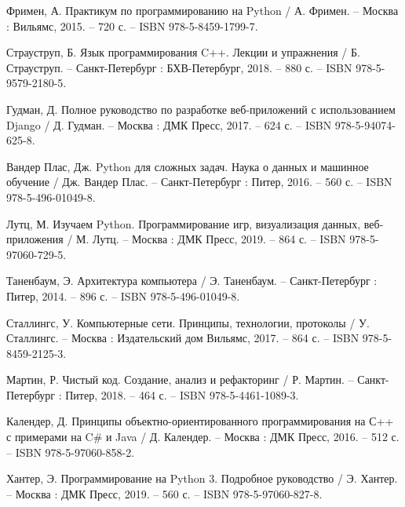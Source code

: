 
\begin{thebibliography}{99}
	
	 Фримен, А. Практикум по программированию на Python / А. Фримен. – Москва : Вильямс, 2015. – 720 с. – ISBN 978-5-8459-1799-7.
	
	 Страуструп, Б. Язык программирования C++. Лекции и упражнения / Б. Страуструп. – Санкт-Петербург : БХВ-Петербург, 2018. – 880 с. – ISBN 978-5-9579-2180-5.
	
	 Гудман, Д. Полное руководство по разработке веб-приложений с использованием Django / Д. Гудман. – Москва : ДМК Пресс, 2017. – 624 с. – ISBN 978-5-94074-625-8.
	
	 Вандер Плас, Дж. Python для сложных задач. Наука о данных и машинное обучение / Дж. Вандер Плас. – Санкт-Петербург : Питер, 2016. – 560 с. – ISBN 978-5-496-01049-8.
	
	 Лутц, М. Изучаем Python. Программирование игр, визуализация данных, веб-приложения / М. Лутц. – Москва : ДМК Пресс, 2019. – 864 с. – ISBN 978-5-97060-729-5.
	
	 Таненбаум, Э. Архитектура компьютера / Э. Таненбаум. – Санкт-Петербург : Питер, 2014. – 896 с. – ISBN 978-5-496-01049-8.
	
	 Сталлингс, У. Компьютерные сети. Принципы, технологии, протоколы / У. Сталлингс. – Москва : Издательский дом Вильямс, 2017. – 864 с. – ISBN 978-5-8459-2125-3.
	
	 Мартин, Р. Чистый код. Создание, анализ и рефакторинг / Р. Мартин. – Санкт-Петербург : Питер, 2018. – 464 с. – ISBN 978-5-4461-1089-3.
	
	 Календер, Д. Принципы объектно-ориентированного программирования на С++ с примерами на C# и Java / Д. Календер. – Москва : ДМК Пресс, 2016. – 512 с. – ISBN 978-5-97060-858-2.
	
	 Хантер, Э. Программирование на Python 3. Подробное руководство / Э. Хантер. – Москва : ДМК Пресс, 2019. – 560 с. – ISBN 978-5-97060-827-8.
	
\end{thebibliography}
